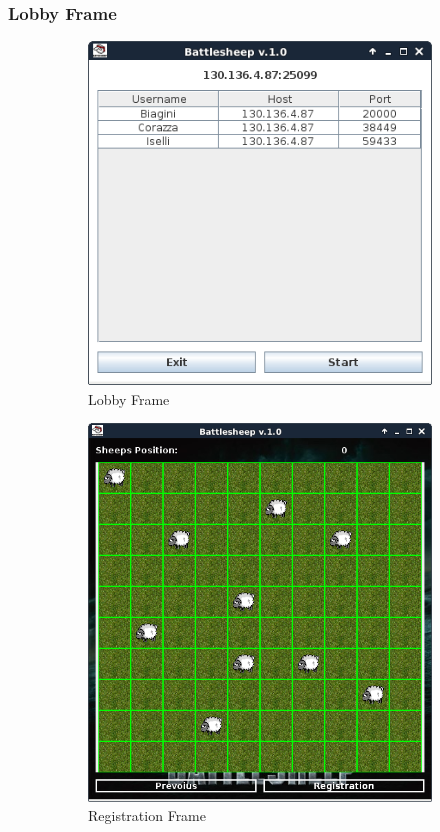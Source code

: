 \subsubsection{Lobby Frame}
\begin{figure}[!h]
	\begin{subfigure}{.5\textwidth}
		\centering
		\includegraphics[scale=0.4]{core/imgs/gui/lobby_frame}
		\caption{Lobby Frame}
		\label{figure:lobby_frame}
	\end{subfigure}
	\begin{subfigure}{.5\textwidth}
		\centering
		\includegraphics[scale=0.3]{core/imgs/gui/registration_frame}
		\caption{Registration Frame}
		\label{figure:registration_frame}
	\end{subfigure}
	\caption{}
\end{figure}
